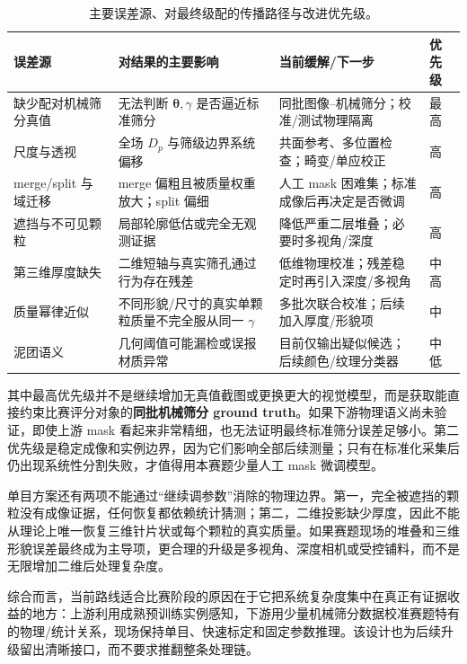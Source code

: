 \begin{table}[t]
\centering
\caption{主要误差源、对最终级配的传播路径与改进优先级。}
\label{tab:r-limits}
\footnotesize
\renewcommand{\arraystretch}{1.13}
\begin{tabular}{>{\raggedright\arraybackslash}p{2.7cm}>{\raggedright\arraybackslash}p{4.1cm}>{\raggedright\arraybackslash}p{4.3cm}>{\centering\arraybackslash}p{1.5cm}}
\toprule
误差源 & 对结果的主要影响 & 当前缓解/下一步 & 优先级 \\
\midrule
缺少配对机械筛分真值 & 无法判断 $\boldsymbol{\theta},\gamma$ 是否逼近标准筛分 & 同批图像--机械筛分；校准/测试物理隔离 & 最高 \\
尺度与透视 & 全场 $D_p$ 与筛级边界系统偏移 & 共面参考、多位置检查；畸变/单应校正 & 高 \\
merge/split 与域迁移 & merge 偏粗且被质量权重放大；split 偏细 & 人工 mask 困难集；标准成像后再决定是否微调 & 高 \\
遮挡与不可见颗粒 & 局部轮廓低估或完全无观测证据 & 降低严重二层堆叠；必要时多视角/深度 & 高 \\
第三维厚度缺失 & 二维短轴与真实筛孔通过行为存在残差 & 低维物理校准；残差稳定时再引入深度/多视角 & 中高 \\
质量幂律近似 & 不同形貌/尺寸的真实单颗粒质量不完全服从同一 $\gamma$ & 多批次联合校准；后续加入厚度/形貌项 & 中 \\
泥团语义 & 几何阈值可能漏检或误报材质异常 & 目前仅输出疑似候选；后续颜色/纹理分类器 & 中低 \\
\bottomrule
\end{tabular}
\end{table}

其中最高优先级并不是继续增加无真值截图或更换更大的视觉模型，而是获取能直接约束比赛评分对象的\textbf{同批机械筛分 ground truth}。如果下游物理语义尚未验证，即使上游 mask 看起来非常精细，也无法证明最终标准筛分误差足够小。第二优先级是稳定成像和实例边界，因为它们影响全部后续测量；只有在标准化采集后仍出现系统性分割失败，才值得用本赛题少量人工 mask 微调模型。

单目方案还有两项不能通过“继续调参数”消除的物理边界。第一，完全被遮挡的颗粒没有成像证据，任何恢复都依赖统计猜测；第二，二维投影缺少厚度，因此不能从理论上唯一恢复三维针片状或每个颗粒的真实质量。如果赛题现场的堆叠和三维形貌误差最终成为主导项，更合理的升级是多视角、深度相机或受控铺料，而不是无限增加二维后处理复杂度。

综合而言，当前路线适合比赛阶段的原因在于它把系统复杂度集中在真正有证据收益的地方：上游利用成熟预训练实例感知，下游用少量机械筛分数据校准赛题特有的物理/统计关系，现场保持单目、快速标定和固定参数推理。该设计也为后续升级留出清晰接口，而不要求推翻整条处理链。
